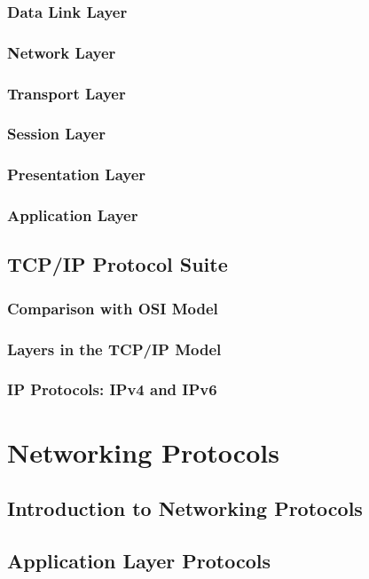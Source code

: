 \documentclass{book}
\begin{document}
        \subsection{Data Link Layer}
        \subsection{Network Layer}
        \subsection{Transport Layer}
        \subsection{Session Layer}
        \subsection{Presentation Layer}
        \subsection{Application Layer}
    \section{TCP/IP Protocol Suite}
        \subsection{Comparison with OSI Model}
        \subsection{Layers in the TCP/IP Model}
        \subsection{IP Protocols: IPv4 and IPv6}
        
\chapter{Networking Protocols}
    \section{Introduction to Networking Protocols}
    \section{Application Layer Protocols}
\end{document}
